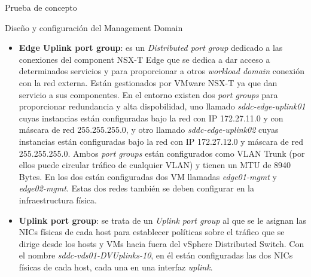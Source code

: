 \begin{section}{Prueba de concepto}
\begin{subsection}{Diseño y configuración del Management Domain}
\begin{itemize}
            \item \textbf{Edge Uplink port group}: es un \textit{Distributed port group} dedicado a las conexiones del component NSX-T Edge que se dedica a dar acceso a determinados servicios y para proporcionar a otros \textit{workload domain} conexión con la red externa. Están gestionados por VMware NSX-T ya que dan servicio a sus componentes. En el entorno existen dos \textit{port groups} para proporcionar redundancia y alta dispobilidad, uno llamado \textit{sddc-edge-uplink01} cuyas instancias están configuradas bajo la red con IP 172.27.11.0 y con máscara de red 255.255.255.0, y otro llamado \textit{sddc-edge-uplink02} cuyas instancias están configuradas bajo la red con IP 172.27.12.0 y máscara de red 255.255.255.0. Ambos \textit{port groups} están configurados como VLAN Trunk (por ellos puede circular tráfico de cualquier VLAN) y tienen un MTU de 8940 Bytes. En los dos están configuradas dos VM llamadas \textit{edge01-mgmt} y \textit{edge02-mgmt}. Estas dos redes también se deben configurar en la infraestructura física.
            
            \item \textbf{Uplink port group}: se trata de un \textit{Uplink port group} al que se le asignan las NICs físicas de cada host para establecer políticas sobre el tráfico que se dirige desde los hosts y VMs hacia fuera del vSphere Distributed Switch. Con el nombre \textit{sddc-vds01-DVUplinks-10}, en él están configuradas las dos NICs físicas de cada host, cada una en una interfaz \textit{uplink}.
            

\end{itemize}
\end{subsection}
\end{section}
